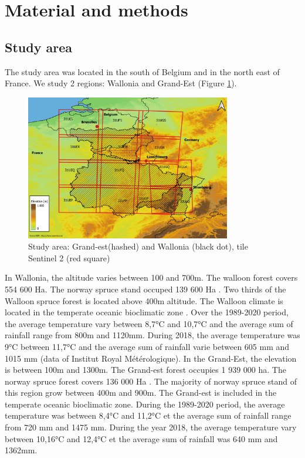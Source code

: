 \documentclass[3p,procedia]{elsarticle}
\begin{document}
\section{Material and methods}
\subsection{Study area}
The study area was located in the south of Belgium and in the north east of France. We study 2 regions: Wallonia and Grand-Est (Figure \ref{fig:situ}).
\begin{figure} [htbp] 
	\centering
	\includegraphics[width=0.8\textwidth]{gde.jpeg}
	\caption{Study area: Grand-est(hashed) and Wallonia (black dot), tile Sentinel 2 (red square)}
	\label{fig:situ}
\end{figure}
In Wallonia, the altitude varies between 100 and 700m.
The walloon forest covers 554 600 Ha. 
The norway spruce stand occuped 139 600 Ha \citep{Alderweireld_2015}. 
Two thirds of the Walloon spruce forest is located above 400m altitude. 
The Walloon climate is located in the temperate oceanic bioclimatic zone \citep{lindner_climate_2010}. 
Over the 1989-2020 period, the average temperature vary between 8,7°C and 10,7°C and the average sum of rainfall range from 800m and 1120mm. 
During 2018, the average temperature was 9°C between 11,7°C and the average sum of rainfall varie between 605 mm and 1015 mm (data of Institut Royal Métérologique). 
In the Grand-Est, the elevation is between 100m and 1300m. 
The Grand-est forest occupies 1 939 000 ha. 
The norway spruce forest covers 136 000 Ha \citep{IGN2022}. 
The majority of norway spruce stand of this region grow between 400m and 900m. 
The Grand-est is included in the temperate oceanic bioclimatic zone\citep{lindner_climate_2010}. 
During the 1989-2020 period, the average temperature was between  8,4°C and 11,2°C et the average sum of rainfall range from 720 mm and 1475 mm. 
During the year 2018, the average temperature vary between 10,16°C and 12,4°C et the average sum of rainfall was 640 mm and 1362mm.
\end{document}

